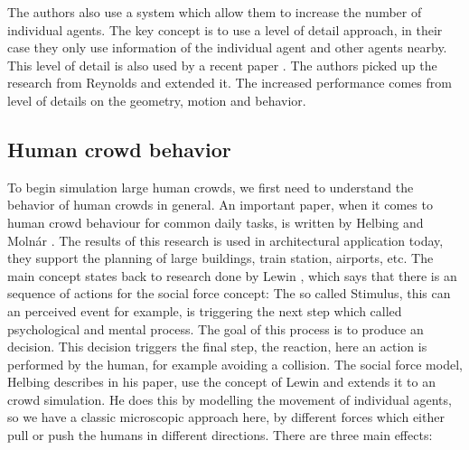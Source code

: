 \documentclass{acmsiggraph}               %
\begin{document}
The authors also use a system which allow them to increase the number of individual agents. The key concept is to use a level of detail approach, in their case they only use information of the individual agent and other agents nearby. This level of detail is also used by a recent paper \cite{osullivan_levels_2002}. The authors picked up the research from Reynolds and extended it. The increased performance comes from level of details on the geometry, motion and behavior.

\subsection{Human crowd behavior}
\label{chap:helbing} To begin simulation large human crowds, we first need to understand the behavior of human crowds in general. An important paper, when it comes to human crowd behaviour for common daily tasks, is written by Helbing and Molnár . 
 The results of this research is used in architectural application today, they support the planning of large buildings, train station, airports, etc.
The main concept states back to research done by Lewin , which says that there is an sequence of actions for the social force concept: The so called Stimulus, this can an perceived event for example, is triggering the next step which called psychological and mental process. The goal of this process is to produce an decision. This decision triggers the final step, the reaction, here an action is performed by the human, for example avoiding a collision.
The social force model, Helbing describes in his paper, use the concept of Lewin and extends it to an crowd simulation. He does this by modelling the movement of individual agents, so we have a classic microscopic approach here, by different forces which either pull or push the humans in different directions. There are three main effects: 
\end{document}
